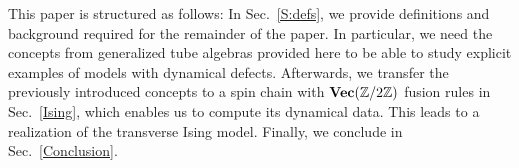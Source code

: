 
This paper is structured as follows: In Sec.~\ref{S:defs}, we provide definitions and background required for the remainder of the paper. In particular, we need the concepts from generalized tube algebras provided here to be able to study explicit examples of models with dynamical defects. Afterwards, we transfer the previously introduced concepts to a spin chain with $\textbf{Vec}(\mathbb{Z}/2\mathbb{Z})$ fusion rules in Sec.~\ref{Ising}, which enables us to compute its dynamical data. This leads to a realization of the transverse Ising model. Finally, we conclude in Sec.~\ref{Conclusion}.